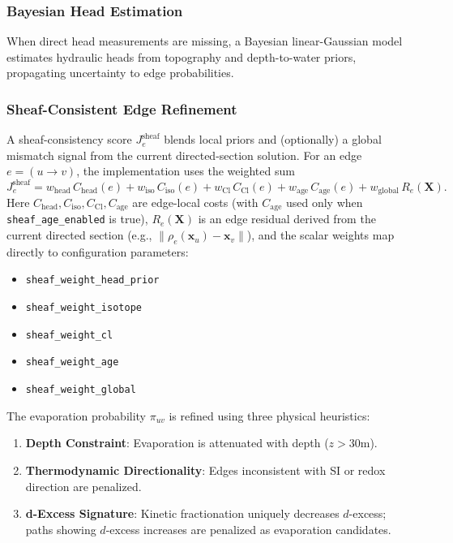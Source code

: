 \documentclass[12pt,a4paper]{article}
\theoremstyle{plain}
\theoremstyle{definition}
\theoremstyle{remark}
\begin{document}
\subsubsection{Bayesian Head Estimation}
When direct head measurements are missing, a Bayesian linear-Gaussian model estimates hydraulic heads from topography and depth-to-water priors, propagating uncertainty to edge probabilities.

\subsubsection{Sheaf-Consistent Edge Refinement}

A sheaf-consistency score $J^{\text{sheaf}}_e$ blends local priors and (optionally) a global mismatch signal from the current directed-section solution.
For an edge $e=(u\to v)$, the implementation uses the weighted sum
\begin{equation}
J^{\text{sheaf}}_e
= w_{\mathrm{head}}\,C_{\mathrm{head}}(e)
+ w_{\mathrm{iso}}\,C_{\mathrm{iso}}(e)
+ w_{\mathrm{Cl}}\,C_{\mathrm{Cl}}(e)
+ w_{\mathrm{age}}\,C_{\mathrm{age}}(e)
+ w_{\mathrm{global}}\,R_e(\mathbf{X}).
\end{equation}
Here $C_{\mathrm{head}},C_{\mathrm{iso}},C_{\mathrm{Cl}},C_{\mathrm{age}}$ are edge-local costs (with $C_{\mathrm{age}}$ used only when \texttt{sheaf\_\allowbreak age\_\allowbreak enabled} is true), $R_e(\mathbf{X})$ is an edge residual derived from the current directed section (e.g., $\|\rho_e(\mathbf{x}_u)-\mathbf{x}_v\|$), and the scalar weights map directly to configuration parameters:
\begin{itemize}
	\item \texttt{sheaf\_\allowbreak weight\_\allowbreak head\_\allowbreak prior}
	\item \texttt{sheaf\_\allowbreak weight\_\allowbreak isotope}
	\item \texttt{sheaf\_\allowbreak weight\_\allowbreak cl}
	\item \texttt{sheaf\_\allowbreak weight\_\allowbreak age}
	\item \texttt{sheaf\_\allowbreak weight\_\allowbreak global}
\end{itemize}

The evaporation probability $\pi_{uv}$ is refined using three physical heuristics:
\begin{enumerate}
	\item \textbf{Depth Constraint}: Evaporation is attenuated with depth ($z > 30$m).
	\item \textbf{Thermodynamic Directionality}: Edges inconsistent with SI or redox direction are penalized.
	\item \textbf{d-Excess Signature}: Kinetic fractionation uniquely decreases $d$-excess; paths showing $d$-excess increases are penalized as evaporation candidates.
\end{enumerate}
\end{document}

